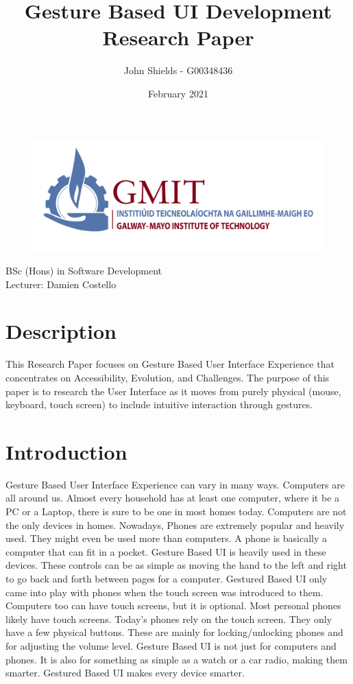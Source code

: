 \documentclass{article}
\title{\huge{\textbf{Gesture Based UI Development}} \\
\LARGE{Research Paper}}
\author{John Shields - G00348436}
\date{February 2021}
\begin{document}
\clearpage\maketitle
\thispagestyle{empty}
\begin{center}
    \begin{figure}[h]
        \centering
        \includegraphics[width=15cm]{pics/logo-gmit.png}
        \label{fig:logo}
    \end{figure}
    \large{	BSc (Hons) in Software Development \\
    Lecturer: Damien Costello}
\end{center}
\newpage
\setcounter{page}{1}
\tableofcontents
\listoffigures

\newpage
{} %

\section{Description}
This Research Paper focuses on Gesture Based User Interface Experience that concentrates on Accessibility, Evolution, and Challenges. The purpose of this paper is to research the User Interface as it moves from purely physical (mouse, keyboard, touch screen) to include intuitive interaction through gestures.

\section{Introduction}
Gesture Based User Interface Experience can vary in many ways. Computers are all around us. Almost every household has at least one computer, where it be a PC or a Laptop, there is sure to be one in most homes today. Computers are not the only devices in homes. Nowadays, Phones are extremely popular and heavily used. They might even be used more than computers. A phone is basically a computer that can fit in a pocket. Gesture Based UI is heavily used in these devices. These controls can be as simple as moving the hand to the left and right to go back and forth between pages for a computer. Gestured Based UI only came into play with phones when the touch screen was introduced to them. Computers too can have touch screens, but it is optional. Most personal phones likely have touch screens. Today’s phones rely on the touch screen. They only have a few physical buttons. These are mainly for locking/unlocking phones and for adjusting the volume level. Gesture Based UI is not just for computers and phones. It is also for something as simple as a watch or a car radio, making them smarter. Gestured Based UI makes every device smarter.
\end{document}
